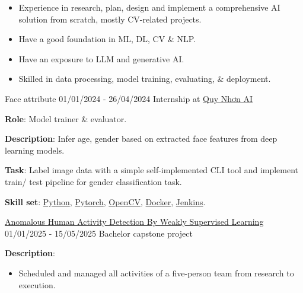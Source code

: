 \documentclass{src/preamble/doc_class}
\begin{document}
	\begin{MainPart}
		
		\Specialty
		{
			\begin{itemize}[label=$\bullet$,topsep=-.5ex,itemsep=-0.5ex]
				\item Experience in research, plan, design and implement a comprehensive AI solution from scratch, mostly CV-related projects.
				\item Have a good foundation in ML, DL, CV \& NLP.
				\item Have an exposure to LLM and generative AI.
				\item Skilled in data processing, model training, evaluating, \& deployment.
			\end{itemize}
		}
		
        \Experience
        {\ColorHighlight}
        {Face attribute}
        {01/01/2024 - 26/04/2024}
        {Internship at \href{https://qaidora.com/}{Quy Nhơn AI}}
        {
            \textbf{Role}: Model trainer \& evaluator.\\
            \vspace{.15cm}

            \textbf{Description}: Infer age, gender based on extracted face features from deep learning models.
            \vspace{.15cm}
            
            \textbf{Task}: Label image data with a simple self-implemented CLI tool and implement train/ test pipeline for gender classification task.\\
            \vspace{.15cm}

            \textbf{Skill set}: \href{https://www.python.org/}{Python}, \href{https://pytorch.org/}{Pytorch}, \href{https://opencv.org/}{OpenCV}, \href{https://www.docker.com/}{Docker}, \href{https://www.jenkins.io/}{Jenkins}.
        }

        \Experience
        {\ColorHighlight}
        {\href{https://github.com/diligent-man/Video_Anomaly_Detection}{Anomalous Human Activity Detection By Weakly Supervised Learning}}
        {01/01/2025 - 15/05/2025}
        {Bachelor capstone project}
        {
            \textbf{Description}:
            \begin{itemize}[label=$\bullet$,topsep=-.5ex,itemsep=-0.5ex]
            	\item Scheduled and managed all activities of a five-person team from research to execution.
            	

\end{itemize}}
\end{MainPart}
\end{document}
